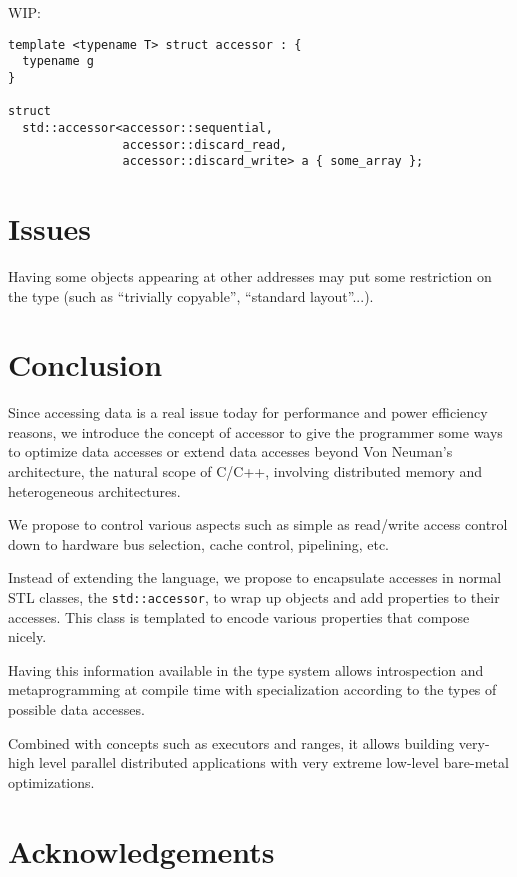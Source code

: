 \documentclass[a4paper]{article}
\begin{document}
WIP:
\begin{lstlisting}
template <typename T> struct accessor : {
  typename g
}

struct
  std::accessor<accessor::sequential,
                accessor::discard_read,
                accessor::discard_write> a { some_array };

\end{lstlisting}


\section{Issues}
\label{sec:issues}

Having some objects appearing at other addresses may put some
restriction on the type (such as ``trivially copyable'', ``standard
layout''...).


\section{Conclusion}
\label{sec:conclusion}

Since accessing data is a real issue today for performance and power
efficiency reasons, we introduce the concept of accessor to give the
programmer some ways to optimize data accesses or extend data accesses
beyond Von Neuman's architecture, the natural scope of C/C++,
involving distributed memory and heterogeneous architectures.

We propose to control various aspects such as simple as read/write
access control down to hardware bus selection, cache control,
pipelining, etc.

Instead of extending the language, we propose to encapsulate accesses
in normal STL classes, the \lstinline|std::accessor|, to wrap up
objects and add properties to their accesses. This class is templated
to encode various properties that compose nicely.

Having this information available in the type system allows
introspection and metaprogramming at compile time with specialization
according to the types of possible data accesses.

Combined with concepts such as executors and ranges, it allows
building very-high level parallel distributed applications with very
extreme low-level bare-metal optimizations.


\section*{Acknowledgements}
\label{sec:acknowledgements}
\end{document}

